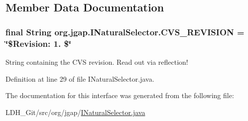 \subsection{Member Data Documentation}
\hypertarget{interfaceorg_1_1jgap_1_1_i_natural_selector_ac66372e84a053edd10b5c4c52ef2d365}{
\subsubsection[{C\-V\-S\-\_\-\-R\-E\-V\-I\-S\-I\-O\-N}]{\setlength{\rightskip}{0pt plus 5cm}final String org.\-jgap.\-I\-Natural\-Selector.\-C\-V\-S\-\_\-\-R\-E\-V\-I\-S\-I\-O\-N = \char`\"{}\$Revision\-: 1. \$\char`\"{}\hspace{0.3cm}{\ttfamily [static]}}}\label{interfaceorg_1_1jgap_1_1_i_natural_selector_ac66372e84a053edd10b5c4c52ef2d365}
String containing the C\-V\-S revision. Read out via reflection! 

Definition at line 29 of file I\-Natural\-Selector.\-java.



The documentation for this interface was generated from the following file\-:\begin{DoxyCompactItemize}
\item 
L\-D\-H\-\_\-\-Git/src/org/jgap/\hyperlink{_i_natural_selector_8java}{I\-Natural\-Selector.\-java}\end{DoxyCompactItemize}

